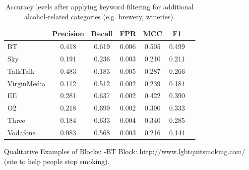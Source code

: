 \documentclass{bmcart}
\begin{document}
\begin{table}[h!]
\caption{Accuracy levels after applying keyword filtering for additional alcohol-related categories (e.g. brewery, wineries).}
  \begin{tabular}{ l c c c c c c}
    \hline
     & Precision & Recall & FPR & MCC & F1 \\
    \hline
	BT & 0.418 & 0.619 & 0.006 & 0.505 & 0.499 \\
    Sky & 0.191 & 0.236 & 0.003 & 0.210 & 0.211 \\
    TalkTalk & 0.483 & 0.183 & 0.005 & 0.287 & 0.266 \\
	VirginMedia & 0.112 & 0.512 & 0.002 & 0.239 & 0.184 \\
	\hline    
	EE & 0.281 & 0.637 & 0.002 & 0.422 & 0.390 \\
	O2 & 0.218 & 0.699 & 0.002 & 0.390 & 0.333 \\
	Three & 0.184 & 0.633 & 0.004 & 0.340 & 0.285 \\
	Vodafone & 0.083 & 0.568 & 0.003 & 0.216 & 0.144 \\
    \hline
  \end{tabular}
\end{table}






Qualitative Examples of Blocks:
-BT Block: http://www.lgbtquitsmoking.com/ (site to help people stop smoking).
\end{document}
